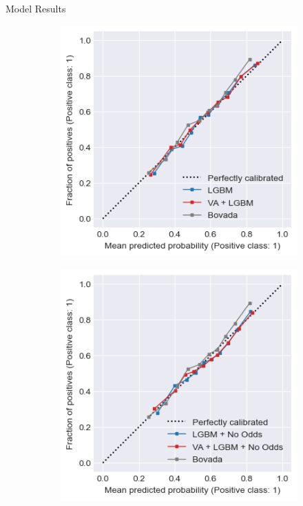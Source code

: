 \documentclass[final]{beamer}
\newlength{\colwidth}
\begin{document}
\begin{frame}[t]
\begin{columns}[t]
\begin{column}{\colwidth}
\begin{block}{Model Results}
\begin{figure}
\begin{subfigure}{.24\linewidth}
        \end{subfigure}
        \begin{subfigure}{.24\linewidth}
            \centering
            \includegraphics[width=\linewidth]{figures/lightgbm_and_va.png}
        \end{subfigure}
        \begin{subfigure}{.24\linewidth}
            \centering
            \includegraphics[width=\linewidth]{figures/lightgbm_no_odds_and_va.png}

\end{subfigure}
\end{figure}
\end{block}
\end{column}
\end{columns}
\end{frame}
\end{document}
